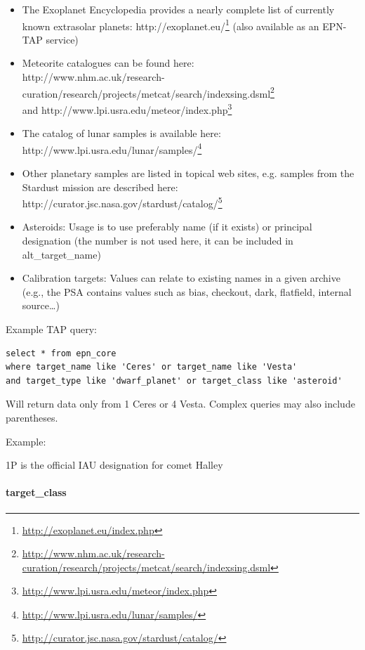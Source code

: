 \documentclass[11pt,a4paper]{ivoa}
\begin{document}
\begin{itemize}
\item The Exoplanet Encyclopedia provides a nearly complete list of currently known extrasolar planets: http://exoplanet.eu/\footnote{\url{http://exoplanet.eu/index.php}} (also available as an EPN-TAP service)
\item Meteorite catalogues can be found here: \\http://www.nhm.ac.uk/research-curation/research/projects/metcat/search/indexsing.dsml\footnote{\url{http://www.nhm.ac.uk/research-curation/research/projects/metcat/search/indexsing.dsml}} \\and http://www.lpi.usra.edu/meteor/index.php\footnote{\url{http://www.lpi.usra.edu/meteor/index.php}}
\item The catalog of lunar samples is available here: http://www.lpi.usra.edu/lunar/samples/\footnote{\url{http://www.lpi.usra.edu/lunar/samples/}}
\item Other planetary samples are listed in topical web sites, e.g. samples from the Stardust mission are described here: \\http://curator.jsc.nasa.gov/stardust/catalog/\footnote{\url{http://curator.jsc.nasa.gov/stardust/catalog/}}
\item Asteroids: Usage is to use preferably name (if it exists) or principal designation (the number is not used here, it can be included in alt\_target\_name)
\item Calibration targets: Values can relate to existing names in a given archive (e.g., the PSA contains values such as bias, checkout, dark, flatfield, internal source…)
\end{itemize}

Example TAP query:

\begin{verbatim}
select * from epn_core 
where target_name like 'Ceres' or target_name like 'Vesta' 
and target_type like 'dwarf_planet' or target_class like 'asteroid'
\end{verbatim}

Will return data only from 1 Ceres or 4 Vesta. Complex queries may also include parentheses.


Example:

1P is the official IAU designation for comet Halley

\paragraph{target\_class}
\end{document}

